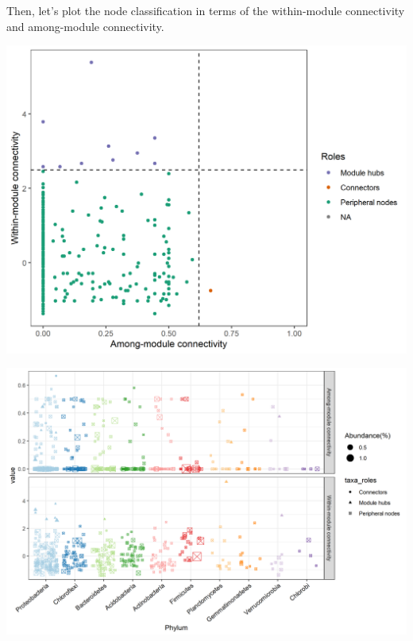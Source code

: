 \documentclass[
]{book}
\newenvironment{Shaded}{\begin{snugshade}}{\end{snugshade}}
\newcommand{\AttributeTok}[1]{\textcolor[rgb]{0.77,0.63,0.00}{#1}}
\newcommand{\CommentTok}[1]{\textcolor[rgb]{0.56,0.35,0.01}{\textit{#1}}}
\newcommand{\DecValTok}[1]{\textcolor[rgb]{0.00,0.00,0.81}{#1}}
\newcommand{\FunctionTok}[1]{\textcolor[rgb]{0.00,0.00,0.00}{#1}}
\newcommand{\NormalTok}[1]{#1}
\newcommand{\SpecialCharTok}[1]{\textcolor[rgb]{0.00,0.00,0.00}{#1}}
\begin{document}
Then, let's plot the node classification in terms of the within-module connectivity and among-module connectivity.

\begin{Shaded}
\end{Shaded}

\begin{center}\includegraphics[width=700px]{Images/trans_network_taxa_roles} \end{center}

\begin{Shaded}
\end{Shaded}

\begin{center}\includegraphics[width=800px]{Images/trans_network_taxa_roles_2} \end{center}
\end{document}
